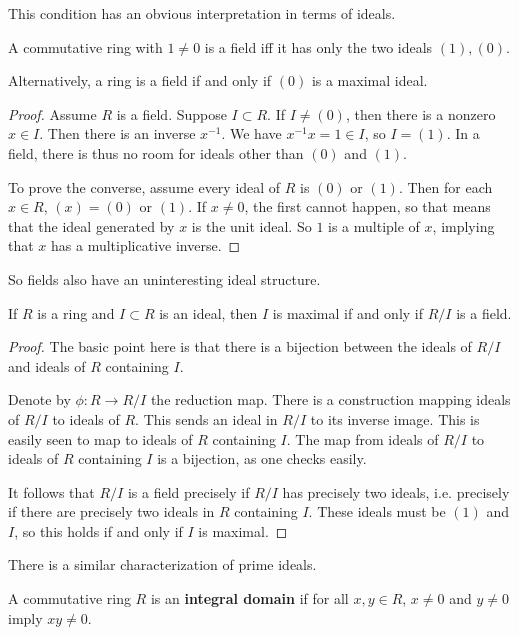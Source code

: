 This condition has an obvious interpretation in terms of ideals.
\begin{proposition} 
A commutative ring with $1 \neq 0$ is a field iff it has only the two ideals $(1),
(0)$.
\end{proposition} 

Alternatively, a ring is a field if and only if $(0)$ is a maximal ideal.

\begin{proof} 
Assume $R$ is a field.  Suppose $I \subset R$.  If $I \neq (0)$, then there is
a nonzero $x \in I$. Then there is an inverse $x^{-1}$. We have $x^{-1} x =1
\in I$, so $I = (1)$.
In a field, there is thus 	no room for ideals other than $(0)$ and $(1)$.

To prove the converse, assume every ideal of $R$ is $(0)$ or $(1)$. Then for
each $x \in R$, $(x) = (0)$ or $(1)$. If $x \neq 0$, the first cannot happen, so
that means that the ideal generated by $x$ is the unit ideal. So $1$ is a
multiple of $x$, implying that $x$ has a multiplicative inverse.
\end{proof} 

So fields also have an uninteresting ideal structure.

\begin{corollary} \label{maximalfield}
If $R$ is a ring and $I \subset R$ is an ideal, then $I$ is maximal if and only
if $R/I$ is a field.
\end{corollary} 

\begin{proof}
The basic point here is that there is a bijection between the ideals of $R/I$
and ideals of $R$ containing $I$. 

Denote  by $\phi: R \to R/I$ the reduction map. There is a
construction mapping ideals of $R/I$ to ideals of $R$. This sends an ideal in
$R/I$ to
its inverse image.  This is easily seen to map to ideals of $R$ containing $I$.
The map from ideals of $R/I$ to ideals of $R$ containing $I$ is a bijection,
as one checks easily.

It follows that $R/I$ is a field precisely if
$R/I$ has precisely two ideals, i.e. precisely if there are precisely two
ideals in $R$ containing $I$. These ideals must be $(1)$ and $I$, so this
holds if and only if $I$ is maximal.
\end{proof} 

There is a similar characterization of prime ideals.

\begin{definition} 
A commutative ring $R$ is an \textbf{integral domain} if for all $ x,y \in R$,
$x \neq 0 $ and $y \neq 0$ imply $xy \neq 0$.
\end{definition} 

